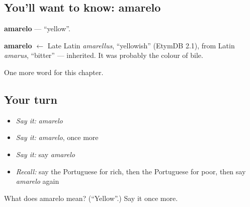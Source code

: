 \subsection*{You'll want to know: amarelo}
\textbf{amarelo} — \textquotedblleft{}yellow\textquotedblright{}.

\begin{cousinweb}
\textbf{amarelo} $\leftarrow$ Late Latin \emph{amarellus}, \textquotedblleft{}yellowish\textquotedblright{} (EtymDB 2.1), from Latin \emph{amarus}, \textquotedblleft{}bitter\textquotedblright{} — inherited. It was probably the colour of bile.
\end{cousinweb}

\begin{grammarlens}[title={What you've built}]
One more word for this chapter.
\end{grammarlens}

\subsection*{Your turn}
\begin{itemize}
\raggedright
  \item \emph{Say it:} \emph{amarelo}
  \item \emph{Say it:} \emph{amarelo}, once more
  \item \emph{Say it:} say \emph{amarelo}
  \item \emph{Recall:} say the Portuguese for rich, then the Portuguese for poor, then say \emph{amarelo} again
\end{itemize}

\begin{tcolorbox}[breakable,colback=teal!4,colframe=teal!35!black,title={Before you move on}]
What does amarelo mean? (\textquotedblleft{}Yellow\textquotedblright{}.) Say it once more.
\end{tcolorbox}
